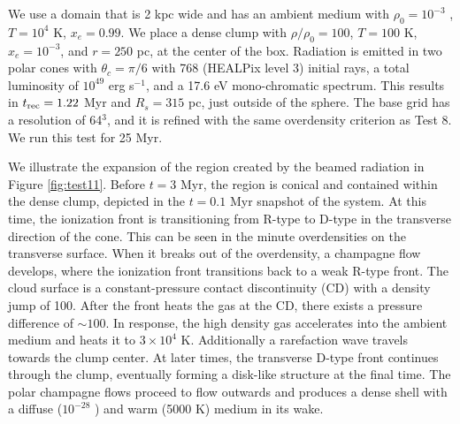 \documentclass[useAMS,usenatbib]{mn2e}
\begin{document}
We use a domain that is 2 kpc wide and has an ambient medium with
$\rho_0 = 10^{-3}$ \cubecm, $T = 10^4$ K, $x_e = 0.99$.  We place a
dense clump with $\rho/\rho_0 = 100$, $T = 100$ K, $x_e = 10^{-3}$,
and $r = 250$ pc, at the center of the box.  Radiation is emitted in
two polar cones with $\theta_c = \pi/6$ with 768 (HEALPix level 3)
initial rays, a total luminosity of $10^{49}$ erg s$^{-1}$, and a 17.6
eV mono-chromatic spectrum.  This results in $t_{\rm rec} = 1.22$ Myr
and $R_s = 315$ pc, just outside of the sphere.  The base grid has a
resolution of 64$^3$, and it is refined with the same overdensity
criterion as Test 8.  We run this test for 25 Myr.

We illustrate the expansion of the \hii region created by the
beamed radiation in Figure \ref{fig:test11}.  Before $t = 3$ Myr, the
\hii region is conical and contained within the dense clump,
depicted in the $t = 0.1$ Myr snapshot of the system.  At this time,
the ionization front is transitioning from R-type to D-type in the
transverse direction of the cone.  This can be seen in the minute
overdensities on the \hii transverse surface.  When it breaks
out of the overdensity, a champagne flow develops, where the
ionization front transitions back to a weak R-type front.  The cloud
surface is a constant-pressure contact discontinuity (CD) with a
density jump of 100.  After the front heats the gas at the CD, there
exists a pressure difference of $\sim 100$.  In response, the high
density gas accelerates into the ambient medium and heats it to $3
\times 10^4$ K.  Additionally a rarefaction wave travels towards the
clump center.  At later times, the transverse D-type front continues
through the clump, eventually forming a disk-like structure at the
final time.  The polar champagne flows proceed to flow outwards and
produces a dense shell with a diffuse ($10^{-28}$ \cubecm) and warm
(5000 K) medium in its wake.

% 
\end{document}

